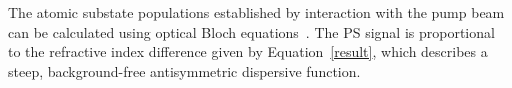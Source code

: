 The atomic substate populations established by interaction with the pump beam can be calculated using optical Bloch equations~\cite{hughes_polarization_2009}.
The PS signal is proportional to the refractive index difference given by Equation~\ref{result}, which describes a steep, background-free antisymmetric dispersive function.


